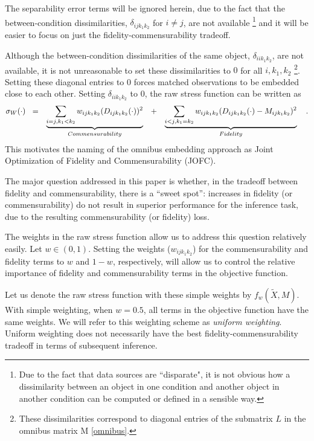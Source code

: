 \documentclass[11pt]{article} %
\begin{document}
 The separability error terms will be ignored herein, due to the fact that the between-condition dissimilarities, 
$\delta_{ijk_1k_2}$ for $i\neq j$, are  not  available \footnote{Due to the fact that data sources are ``disparate", it is not obvious how  a dissimilarity between an object in one condition and another object in another condition  can be computed or  defined in a sensible way.} and it will be easier to focus on just the fidelity-commensurability tradeoff. 

Although  the between-condition dissimilarities of the same object, ${ \delta_{iik_1k_2}}$, are not available,  it is not unreasonable to set these dissimilarities to $0$ for all $i,k_1,k_2$ \footnote{These dissimilarities correspond to  diagonal  entries of the  submatrix $L$ in  the omnibus matrix  M \eqref{omnibus}. }. Setting these diagonal entries to $0$ forces matched observations to be embedded close to each other. Setting $\delta_{iik_1k_2}$ to $0$, the raw stress function can be written as
\begin{align}
\sigma_W(\cdot)\hspace{3pt}   
\hspace{3pt}&=&\underbrace{\sum_{i=j,k_1< k_2}  {w_{ij{k_1}{k_2}}(D_{ij{k_1}{k_2}}(\cdot))^2}}_{Commensurability}  \hspace{10pt}  &  +&\underbrace{\sum_{i< j,k_1=k_2}  {w_{ij{k_1}{k_2}}(D_{ij{k_1}{k_2}}(\cdot)-M_{ijk_1k_2})^2  }  } _{Fidelity}\notag\label{eq:FidCommSep}\hspace{10pt} .
\end{align}
This motivates  the naming of the   omnibus embedding approach as Joint Optimization of Fidelity and Commensurability (JOFC).


The major question  addressed in this paper is whether, in the tradeoff between fidelity and commensurability, there is a ``sweet spot'':  increases in fidelity (or commensurability) do not result in superior performance for  the inference task, due to the resulting commensurability (or fidelity) loss. 

 The weights in the raw stress function allow us to address this question relatively easily. Let $w \in (0,1)$. Setting the weights ($w_{ijk_1k_2}$)  for the commensurability  and fidelity  terms    to $w$ and $1-w$, respectively,  will allow us to control the relative importance of fidelity and commensurability terms in the objective function.

 Let us denote the raw stress function with these simple weights by $f_w(\widetilde{X},M)$. With simple weighting, when $w=0.5$, all terms in the objective function have the same weights. We will refer to this weighting scheme as \emph{uniform weighting}. Uniform weighting does not necessarily have the best fidelity-commensurability tradeoff in terms of subsequent inference. 
\end{document}
